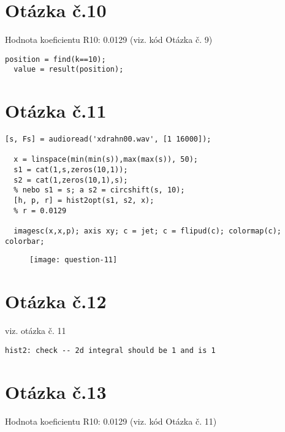 \documentclass[a4paper,11pt]{article}
\begin{document}
\section{Otázka č.10}

Hodnota koeficientu R10: 0.0129 (viz. kód Otázka č. 9)\\

\lstset{language=Matlab}
\begin{lstlisting}[frame=single,breaklines]
  position = find(k==10);
  value = result(position);
\end{lstlisting}

\section{Otázka č.11}

\lstset{language=Matlab}
\begin{lstlisting}[frame=single,breaklines]
  [s, Fs] = audioread('xdrahn00.wav', [1 16000]);

  x = linspace(min(min(s)),max(max(s)), 50);
  s1 = cat(1,s,zeros(10,1));
  s2 = cat(1,zeros(10,1),s);
  % nebo s1 = s; a s2 = circshift(s, 10);
  [h, p, r] = hist2opt(s1, s2, x);
  % r = 0.0129

  imagesc(x,x,p); axis xy; c = jet; c = flipud(c); colormap(c); colorbar;
\end{lstlisting}

\begin{figure}[H]
  \centering
  \texttt{[image: question-11]}
\end{figure}

\section{Otázka č.12}

viz. otázka č. 11

\lstset{language=Matlab}
\begin{lstlisting}[frame=single,breaklines]
  hist2: check -- 2d integral should be 1 and is 1
\end{lstlisting}

\section{Otázka č.13}

Hodnota koeficientu R10: 0.0129 (viz. kód Otázka č. 11)\\

\nocite{*}




\newpage
\thispagestyle{empty}

\end{document}
